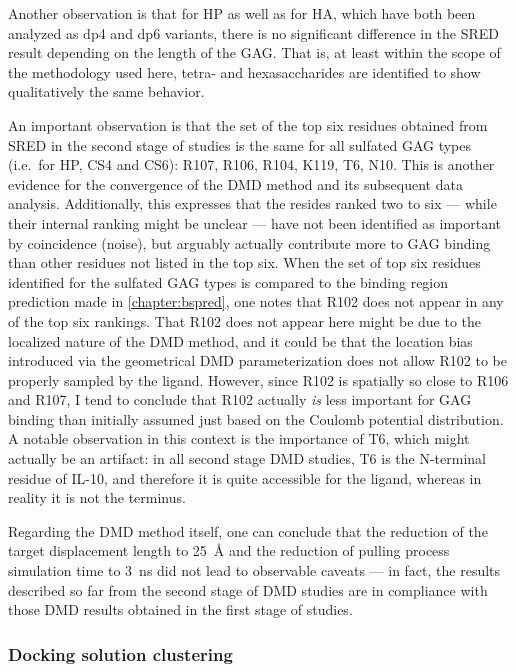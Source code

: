 Another observation is that for HP as well as for HA, which have both been
analyzed as dp4 and dp6 variants, there is no significant difference in the SRED
result depending on the length of the GAG. That is, at least within the scope of
the methodology used here, tetra- and hexasaccharides are identified to show
qualitatively the same behavior.

An important observation is that the set of the top six residues obtained from
SRED in the second stage of studies is the same for all sulfated GAG types
(i.e.\ for HP, CS4 and CS6): R107, R106, R104, K119, T6, N10. This is another
evidence for the convergence of the DMD method and its subsequent data analysis.
Additionally, this expresses that the resides ranked two to six --- while their
internal ranking might be unclear --- have not been identified as important by
coincidence (noise), but arguably actually contribute more to GAG binding than
other residues not listed in the top six. When the set of top six residues
identified for the sulfated GAG types is compared to the binding region
prediction made in \cref{chapter:bspred}, one notes that R102 does not appear in
any of the top six rankings. That R102 does not appear here might be due to the
localized nature of the DMD method, and it could be that the location bias
introduced via the geometrical DMD parameterization does not allow R102 to be
properly sampled by the ligand. However, since R102 is spatially so close to
R106 and R107, I tend to conclude that R102 actually \textit{is} less important
for GAG binding than initially assumed just based on the Coulomb potential
distribution. A notable observation in this context is the importance of T6,
which might actually be an artifact: in all second stage DMD studies, T6 is the
N-terminal residue of IL-10, and therefore it is quite accessible for the
ligand, whereas in reality it is not the terminus.

Regarding the DMD method itself, one can conclude that the reduction of the
target displacement length to \SI{25}{\angstrom} and the reduction of pulling
process simulation time to \SI{3}{\nano\second} did not lead to observable
caveats --- in fact, the results described so far from the second stage of DMD
studies are in compliance with those DMD results obtained in the first stage of
studies.


\subsubsection{Docking solution clustering}


